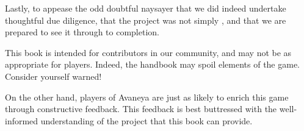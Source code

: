 \item
Lastly, to appease the odd doubtful naysayer that we did indeed undertake thoughtful due diligence, that the project was not simply , and that we are prepared to see it through to completion.
\stopitemize

This book is intended for contributors in our community, and may not be as appropriate for players. Indeed, the handbook may spoil elements of the game. Consider yourself warned!

On the other hand, players of Avaneya are just as likely to enrich this game through constructive feedback. This feedback is best buttressed with the well-informed understanding of the project that this book can provide.

\StopChapter
